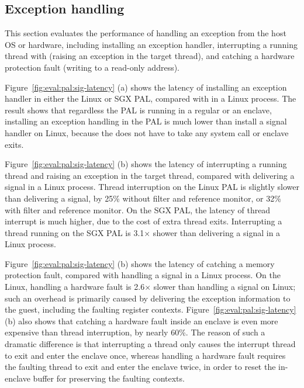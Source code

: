 \subsection{Exception handling}


This section evaluates the performance of handling an exception from the host OS or hardware,
including installing an exception handler,
interrupting a running thread
with  (raising an  exception in the target thread),
and catching a hardware protection fault
(writing to a read-only address).






Figure~\ref{fig:eval:pal:sig-latency} (a)
shows the latency of installing an exception handler in either the Linux or SGX PAL, compared with
 in a Linux process.
The result
shows that regardless the PAL is running in a regular \picoproc{} or an enclave,
installing an exception handling
in the PAL
is much lower than install a signal handler
on Linux,
because the \hostapi{} does not have to take any system call or enclave exits.


Figure~\ref{fig:eval:pal:sig-latency} (b)
shows the latency of interrupting a running thread
and raising an exception
in the target thread, compared with delivering a  signal in a Linux process.
Thread interruption on the Linux PAL
is slightly slower than
delivering a  signal,
by \roughly{}25\% without \seccomp{} filter and reference monitor, or \roughly{}32\% with \seccomp{} filter and reference monitor.
On the SGX PAL,
the latency of thread interrupt
is much higher, due to the cost of extra thread exits.
Interrupting a thread running on the SGX PAL
is \roughly{}3.1$\times$ shower than delivering a  signal in a Linux process.



Figure~\ref{fig:eval:pal:sig-latency} (b)
shows the latency of catching a memory protection fault,
compared with handling
a  signal in a Linux process.
On the Linux, handling a hardware fault is \roughly{}2.6$\times$ slower than handling a  signal on Linux;
such an overhead
is primarily caused by delivering
the exception information to the guest, including the faulting register contexts.
Figure~\ref{fig:eval:pal:sig-latency} (b)
also shows that catching a hardware fault inside an enclave
is even more expensive
than thread interruption, by nearly 60\%.
The reason of such a dramatic difference is that
interrupting a thread only causes the interrupt thread to exit and enter the enclave once,
whereas handling a hardware fault
requires the faulting thread to exit and enter the enclave twice,
in order to reset the in-enclave buffer
for preserving the faulting contexts.


